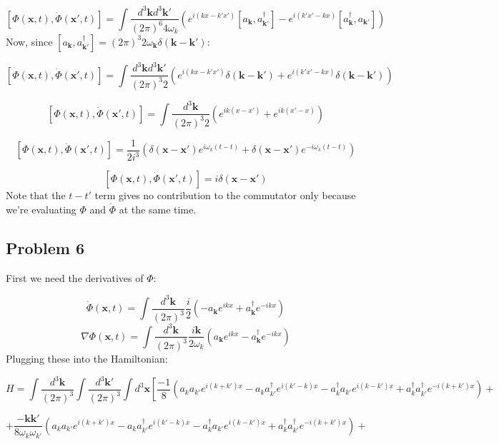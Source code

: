 \documentclass[12 pt]{article}
\begin{document}
\[ [\Phi(\mathbf{x},t) , \dot \Phi(\mathbf{x'},t)] = \int \frac{d^3 \mathbf{k} d^3 \mathbf{k'}}{(2\pi)^6 4\omega_k} \left( e^{i(kx-k'x')}[a_{\mathbf{k}}, a^{\dagger}_{\mathbf{k'}}] - e^{i(k'x'-kx)}[a^{\dagger}_{\mathbf{k}}, a_{\mathbf{k'}}] \right) \]
Now, since $[a_{\mathbf{k}}, a^{\dagger}_{\mathbf{k'}}] = (2\pi)^3 2\omega_{\mathbf{k}} \delta(\mathbf{k}-\mathbf{k'})$:

\[   [\Phi(\mathbf{x},t) , \dot \Phi(\mathbf{x'},t)] = \int \frac{d^3 \mathbf{k} d^3 \mathbf{k'}}{(2\pi)^3 2} \left( e^{i(kx-k'x')}\delta(\mathbf{k}-\mathbf{k'}) + e^{i(k'x'-kx)}\delta(\mathbf{k}-\mathbf{k'}) \right) \]

\[   [\Phi(\mathbf{x},t) , \dot \Phi(\mathbf{x'},t)] = \int \frac{d^3 \mathbf{k}}{(2\pi)^3 2} \left( e^{ik(x-x')} + e^{ik(x'-x)} \right) \]

\[   [\Phi(\mathbf{x},t) , \dot \Phi(\mathbf{x'},t)] = \frac{1}{2i^3} \left(\delta(\mathbf{x}-\mathbf{x'})e^{i\omega_{k}(t-t)} +  \delta(\mathbf{x}-\mathbf{x'})e^{-i\omega_{k}(t-t)} \right) \]

\[   [\Phi(\mathbf{x},t) , \dot \Phi(\mathbf{x'},t)] = i\delta(\mathbf{x}-\mathbf{x'})  \]
Note that the $t-t'$ term gives no contribution to the commutator only because we're evaluating $\Phi$ and $\dot\Phi$ at the same time.


\subsection*{Problem 6}
First we need the derivatives of $\Phi$:

\[ \dot \Phi(\mathbf{x},t) = \int \frac{d^3 \mathbf{k}}{(2\pi)^3} \frac{i}{2} \left( -a_{\mathbf{k}} e^{ikx} + a^{\dagger}_{\mathbf{k}} e^{-ikx}  \right) \]
\[ \nabla \Phi(\mathbf{x},t) = \int \frac{d^3 \mathbf{k}}{(2\pi)^3} \frac{i\mathbf{k}}{2\omega_{k}} \left( a_{\mathbf{k}} e^{ikx} - a^{\dagger}_{\mathbf{k}} e^{-ikx}  \right) \]
Plugging these into the Hamiltonian:

\[  H = \int  \frac{d^3 \mathbf{k}}{(2\pi)^3} \int  \frac{d^3 \mathbf{k'}}{(2\pi)^3} \int d^3 \mathbf{x} \left[  \frac{-1}{8} \left(  a_{k}a_{k'} e^{i(k+k')x}  -   a_{k}a^{\dagger}_{k'} e^{i(k'-k)x}  -   a^{\dagger}_{k}a_{k'} e^{i(k-k')x}  +   a^{\dagger}_{k}a^{\dagger}_{k'} e^{-i(k+k')x} \right)   + \right. \]

\[  +  \frac{-\mathbf{k}\mathbf{k'}}{8\omega_{k}\omega_{k'}} \left(  a_{k}a_{k'} e^{i(k+k')x}  -   a_{k}a^{\dagger}_{k'} e^{i(k'-k)x}  -   a^{\dagger}_{k}a_{k'} e^{i(k-k')x}  +   a^{\dagger}_{k}a^{\dagger}_{k'} e^{-i(k+k')x} \right)  +  \]
\end{document}
